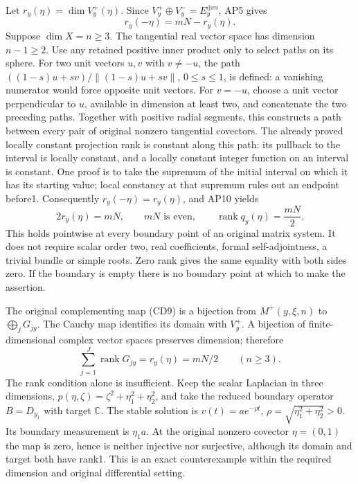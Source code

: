 \documentclass[
  11pt,
]{article}
\begin{document}
Let \(r_y(\eta)=\dim V_y^+(\eta)\). Since
\(V_y^+\oplus V_y^-=E_y^{\oplus m}\), AP5 gives \[
 r_y(-\eta)=mN-r_y(\eta).
 \tag{AP10}
\] Suppose \(\dim X=n\geq3\). The tangential real vector space has
dimension \(n-1\geq2\). Use any retained positive inner product only to
select paths on its sphere. For two unit vectors \(u,v\) with
\(v\ne-u\), the path \(((1-s)u+sv)/\|(1-s)u+sv\|\), \(0\leq s\leq1\), is
defined: a vanishing numerator would force opposite unit vectors. For
\(v=-u\), choose a unit vector perpendicular to \(u\), available in
dimension at least two, and concatenate the two preceding paths.
Together with positive radial segments, this constructs a path between
every pair of original nonzero tangential covectors. The already proved
locally constant projection rank is constant along this path: its
pullback to the interval is locally constant, and a locally constant
integer function on an interval is constant. One proof is to take the
supremum of the initial interval on which it has its starting value;
local constancy at that supremum rules out an endpoint before1.
Consequently \(r_y(-\eta)=r_y(\eta)\), and AP10 yields \[
 2r_y(\eta)=mN,\qquad mN\text{ is even},\qquad \operatorname{rank}q_y(\eta)=\frac{mN}{2}.
 \tag{AP11}
\] This holds pointwise at every boundary point of an original matrix
system. It does not require scalar order two, real coefficients, formal
self-adjointness, a trivial bundle or simple roots. Zero rank gives the
same equality with both sides zero. If the boundary is empty there is no
boundary point at which to make the assertion.

The original complementing map (CD9) is a bijection from
\(M^+(y,\xi,n)\) to \(\bigoplus_jG_{jy}\). The Cauchy map identifies its
domain with \(V_y^+\). A bijection of finite-dimensional complex vector
spaces preserves dimension; therefore \[
 \sum_{j=1}^{J}\operatorname{rank}G_{jy}=r_y(\eta)=mN/2\qquad(n\geq3).
 \tag{AP12}
\] The rank condition alone is insufficient. Keep the scalar Laplacian
in three dimensions, \(p(\eta,\zeta)=\zeta^2+\eta_1^2+\eta_2^2\), and
take the reduced boundary operator \(B=D_{y_1}\) with target
\(\mathbb C\). The stable solution is \(v(t)=a e^{-\rho t}\),
\(\rho=\sqrt{\eta_1^2+\eta_2^2}>0\). Its boundary measurement is
\(\eta_1a\). At the original nonzero covector \(\eta=(0,1)\) the map is
zero, hence is neither injective nor surjective, although its domain and
target both have rank1. This is an exact counterexample within the
required dimension and original differential setting.
\end{document}
